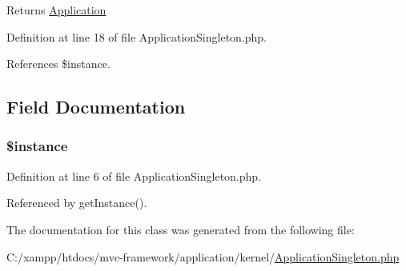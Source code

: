 \begin{DoxyReturn}{Returns}
\hyperlink{class_application}{Application} 
\end{DoxyReturn}


Definition at line 18 of file Application\+Singleton.\+php.



References \$instance.




\subsection{Field Documentation}
\hypertarget{class_application_singleton_a9cfc19b3b4f25b2a9007673c57d2f58c}{}
\subsubsection[{\$instance}]{ \$instance\hspace{0.3cm}{\ttfamily [static]}}\label{class_application_singleton_a9cfc19b3b4f25b2a9007673c57d2f58c}


Definition at line 6 of file Application\+Singleton.\+php.



Referenced by get\+Instance().



The documentation for this class was generated from the following file\+:\begin{DoxyCompactItemize}
\item 
C\+:/xampp/htdocs/mvc-\/framework/application/kernel/\hyperlink{_application_singleton_8php}{Application\+Singleton.\+php}\end{DoxyCompactItemize}

